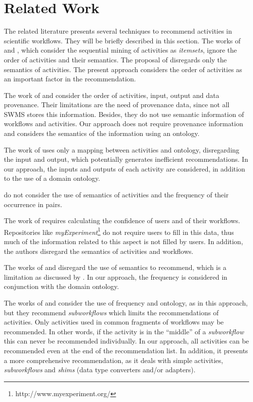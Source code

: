 \documentclass{doublecol-new}
\theoremstyle{TH}{
\newtheorem{lemma}{Lemma}
\newtheorem{theorem}[lemma]{Theorem}
\newtheorem{corrolary}[lemma]{Corrolary}
\newtheorem{conjecture}[lemma]{Conjecture}
\newtheorem{proposition}[lemma]{Proposition}
\newtheorem{claim}[lemma]{Claim}
\newtheorem{stheorem}[lemma]{Wrong Theorem}
\newtheorem{algorithm}{Algorithm}
}
\theoremstyle{THrm}{
\newtheorem{definition}{Definition}[section]
\newtheorem{question}{Question}[section]
\newtheorem{remark}{Remark}
\newtheorem{scheme}{Scheme}
}
\theoremstyle{THhit}{
\newtheorem{case}{Case}[section]
}
\begin{document}
\section*{Related Work}
The related literature presents several techniques to recommend activities in scientific workflows. They will be briefly described in this section. The works of \cite{Shao2007} and \cite{Shao2009}, which consider the sequential mining of activities as \emph{itemsets}, ignore the order of activities and their semantics. The proposal of \cite{TostaBraganholo2015} disregards only the semantics of activities. The present approach considers the order of activities as an important factor in the recommendation.

The work of \cite{Koop2008, Oliveira2008, Wang2009, Zhang2009, Tan2011, Cao2012, Diamantini2012} and \cite{Garijo2013, Yeo2013} consider the order of activities, input, output and data provenance. Their limitations are the need of provenance data, since not all SWMS stores this information. Besides, they do not use semantic information of workflows and activities. Our approach does not require provenance information and considers the semantics of the information using an ontology.

The work of \cite{Bomfim2005} uses only a mapping between activities and ontology, disregarding the input and output, which potentially generates inefficient recommendations. In our approach, the inputs and outputs of each activity are considered, in addition to the use of a domain ontology.

\cite{Wang2008, Leng2010} do not consider the use of semantics of activities and the frequency of their occurrence in pairs.

The work of \cite{Yao2012} requires calculating the confidence of users and of their workflows. Repositories like \emph{myExperiment}\footnote{http://www.myexperiment.org/} do not require users to fill in this data, thus much of the information related to this aspect is not filled by users. In addition, the authors disregard the semantics of activities and workflows.

The works of \cite{Telea1999, Oliveir2010} and \cite{Zhang2011} disregard the use of semantics to recommend, which is a limitation as discussed by \cite{CorchoGarijo2014, Soomro2015}. In our approach, the frequency is considered in conjunction with the domain ontology.

The works of \cite{CorchoGarijo2014} and \cite{Soomro2015} consider the use of frequency and ontology, as in this approach, but they recommend \emph{subworkflows} which limits the recommendations of activities. Only activities used in common fragments of workflows may be recommended. In other words, if the activity is in the ``middle'' of a \emph{subworkflow} this can never be recommended individually. In our approach, all activities can be recommended even at the end of the recommendation list. In addition, it presents a more comprehensive recommendation, as it deals with simple activities, \emph{subworkflows} and \emph{shims} (data type converters and/or adapters).
\end{document}
